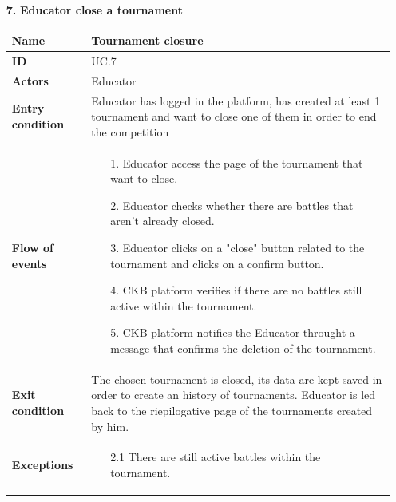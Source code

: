 \documentclass{article}
\begin{document}
{\begin{enumerate}
    \item[\textbf{7.}] \textbf{Educator close a tournament}
          \begin{xltabular}{\textwidth}
              {| >{\raggedright\arraybackslash}g | >{\raggedright\arraybackslash}X |}
              \hline
              \endfirsthead
              \hline
              \endhead
              \endfoot
              \hline
              \endlastfoot




              \textbf{Name} & Tournament closure\\
              \hline
              \textbf{ID} & UC.7\\
              \hline
              \textbf{Actors} & Educator\\
              \hline
              \textbf{Entry condition} & Educator has logged in the platform, has created at least 1 tournament
              and want to close one of them in order to end the competition \\
              \hline
              \textbf{Flow of events} &    \begin{enumerate}
                  \item[1.] Educator access the page of the tournament
                        that want to close.
                  \item[2.] Educator checks whether there are battles that
                        aren't already closed.
                  \item[3.] Educator clicks on a "close" button related to
                        the tournament and clicks on a confirm button.
                  \item[4.] CKB platform verifies if there are no battles
                        still active within the tournament.
                  \item[5.] CKB platform notifies the Educator throught
                        a message that confirms the deletion of the tournament.
              \end{enumerate} \\
              \hline
              \textbf{Exit condition} & The chosen tournament is closed, its data are kept saved in
              order to create an history of tournaments. Educator is led back to the riepilogative
              page of the tournaments created by him. \\
              \hline
              \textbf{Exceptions} &    \begin{itemize}
                  \item[2.1] There are still active battles within the tournament.

\end{itemize}
\end{xltabular}
\end{enumerate}}
\end{document}
